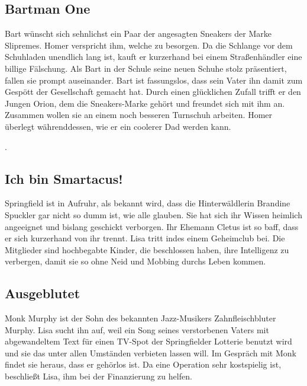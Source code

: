 \subsection{Bartman One}
Bart wünscht sich sehnlichst ein Paar der angesagten Sneakers der Marke Slipremes. Homer verspricht ihm, welche zu besorgen. Da die Schlange vor dem Schuhladen unendlich lang ist, kauft er kurzerhand bei einem Straßenhändler eine billige Fälschung. Als Bart in der Schule seine neuen Schuhe stolz präsentiert, fallen sie prompt auseinander. Bart ist fassungslos, dass sein Vater ihn damit zum Gespött der Gesellschaft gemacht hat. Durch einen glücklichen Zufall trifft er den Jungen Orion, dem die Sneakers-Marke gehört und freundet sich mit ihm an. Zusammen wollen sie an einem noch besseren Turnschuh arbeiten. Homer überlegt währenddessen, wie er ein coolerer Dad werden kann.

.

\subsection{Ich bin Smartacus!}
Springfield ist in Aufruhr, als bekannt wird, dass die Hinterwäldlerin Brandine Spuckler gar nicht so dumm ist, wie alle glauben. Sie hat sich ihr Wissen heimlich angeeignet und bislang geschickt verborgen. Ihr Ehemann Cletus ist so baff, dass er sich kurzerhand von ihr trennt. Lisa tritt indes einem Geheimclub bei. Die Mitglieder sind hochbegabte Kinder, die beschlossen haben, ihre Intelligenz zu verbergen, damit sie so ohne Neid und Mobbing durchs Leben kommen.


\subsection{Ausgeblutet}\label{UABF10}
Monk Murphy ist der Sohn des bekannten Jazz-Musikers Zahnfleischbluter Murphy. Lisa sucht ihn auf, weil ein Song seines verstorbenen Vaters mit abgewandeltem Text für einen TV-Spot der Springfielder Lotterie benutzt wird und sie das unter allen Umständen verbieten lassen will. Im Gespräch mit Monk findet sie heraus, dass er gehörlos ist. Da eine Operation sehr kostspielig ist, beschließt Lisa, ihm bei der Finanzierung zu helfen.

